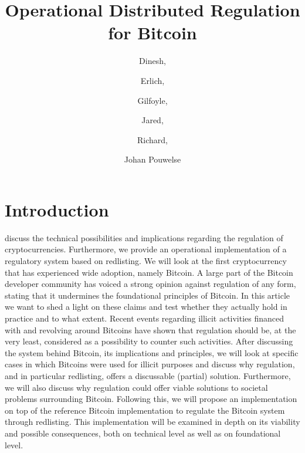 \documentclass[12pt,journal,compsoc]{IEEEtran}
\begin{document}
\title{Operational Distributed Regulation for Bitcoin}

\author{Dinesh, \and Erlich, \and Gilfoyle, \and Jared, \and Richard, \and Johan Pouwelse}


\maketitle
\IEEEpeerreviewmaketitle

\section{Introduction}
 discuss the technical possibilities
and implications regarding the regulation of cryptocurrencies. Furthermore, we provide an operational
implementation of a regulatory system based on redlisting.
We will look at the first cryptocurrency that has experienced
wide adoption\cite{ron2013quantitative}, namely Bitcoin. A large part of the Bitcoin developer community
has voiced a strong opinion against regulation of any form, stating that it
undermines the foundational principles of Bitcoin. In this article we want to shed
a light on these claims and test whether they actually hold in practice and to what extent.
Recent events regarding illicit activities financed with and revolving around Bitcoins have shown that
regulation should be, at the very least, considered as a possibility to counter such activities.
After discussing the system behind Bitcoin, its implications and principles,
we will look at specific cases in which Bitcoins were used for illicit purposes
and discuss why regulation, and in particular redlisting, offers a discussable (partial) solution.
Furthermore, we will also discuss why regulation could offer viable solutions to societal
problems surrounding Bitcoin. Following this, we will propose an implementation on top of the
reference Bitcoin implementation to regulate the Bitcoin system through redlisting.
This implementation will be examined in depth on its
viability and possible consequences, both on technical level as well as on foundational level.
\end{document}
